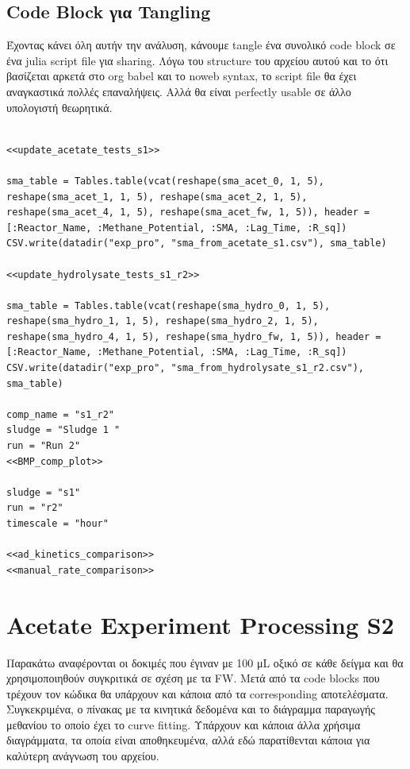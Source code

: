 \documentclass[11pt]{article}
\begin{document}
\subsection{Code Block για Tangling}
\label{sec:orgc7bf641}
Έχοντας κάνει όλη αυτήν την ανάλυση, κάνουμε tangle ένα συνολικό code block σε ένα julia script file για sharing. Λόγω του structure του αρχείου αυτού και το ότι βασίζεται αρκετά στο org babel και το noweb syntax, το script file θα έχει αναγκαστικά πολλές επαναλήψεις. Αλλά θα είναι perfectly usable σε άλλο υπολογιστή θεωρητικά.

\begin{verbatim}

<<update_acetate_tests_s1>>

sma_table = Tables.table(vcat(reshape(sma_acet_0, 1, 5), reshape(sma_acet_1, 1, 5), reshape(sma_acet_2, 1, 5), reshape(sma_acet_4, 1, 5), reshape(sma_acet_fw, 1, 5)), header = [:Reactor_Name, :Methane_Potential, :SMA, :Lag_Time, :R_sq])
CSV.write(datadir("exp_pro", "sma_from_acetate_s1.csv"), sma_table)

<<update_hydrolysate_tests_s1_r2>>

sma_table = Tables.table(vcat(reshape(sma_hydro_0, 1, 5), reshape(sma_hydro_1, 1, 5), reshape(sma_hydro_2, 1, 5), reshape(sma_hydro_4, 1, 5), reshape(sma_hydro_fw, 1, 5)), header = [:Reactor_Name, :Methane_Potential, :SMA, :Lag_Time, :R_sq])
CSV.write(datadir("exp_pro", "sma_from_hydrolysate_s1_r2.csv"), sma_table)

comp_name = "s1_r2"
sludge = "Sludge 1 "
run = "Run 2"
<<BMP_comp_plot>>

sludge = "s1"
run = "r2"
timescale = "hour"

<<ad_kinetics_comparison>>
<<manual_rate_comparison>>
\end{verbatim}

\section{Acetate Experiment Processing S2}
\label{sec:orgac943e3}
Παρακάτω αναφέρονται οι δοκιμές που έγιναν με 100 μL οξικό σε κάθε δείγμα και θα χρησιμοποιηθούν συγκριτικά σε σχέση με τα FW. Μετά από τα code blocks που τρέχουν τον κώδικα θα υπάρχουν και κάποια από τα corresponding αποτελέσματα. Συγκεκριμένα, ο πίνακας με τα κινητικά δεδομένα και το διάγραμμα παραγωγής μεθανίου το οποίο έχει το curve fitting. Υπάρχουν και κάποια άλλα χρήσιμα διαγράμματα, τα οποία είναι αποθηκευμένα, αλλά εδώ παρατίθενται κάποια για καλύτερη ανάγνωση του αρχείου.
\end{document}
